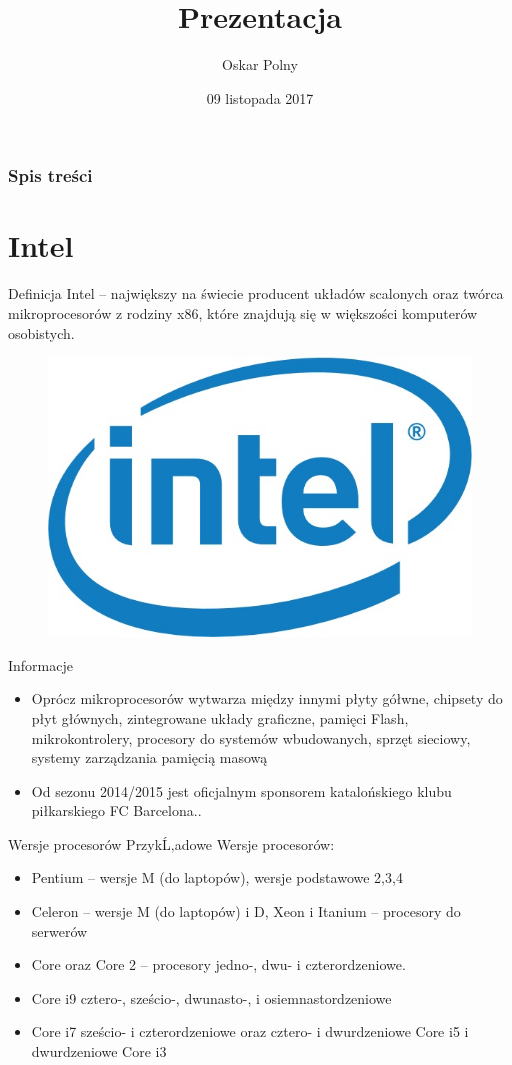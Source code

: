\documentclass{beamer}
\title{Prezentacja}
\author{Oskar Polny}
\date{09 listopada 2017}
\begin{document}
\frame{\titlepage}
\begin{frame}
\frametitle{Spis treści}
\tableofcontents
\end{frame}
\section{Intel}
\begin{frame}{Definicja}
Intel – największy na świecie producent układów scalonych oraz twórca mikroprocesorów z rodziny x86, które znajdują się w większości komputerów osobistych.
\begin{figure}
\centering
\includegraphics[scale=0.20]{Intel.jpg}
\end{figure}
\end{frame}
\begin{frame}{Informacje}
\begin{itemize}
\item<1-2> Oprócz mikroprocesorów wytwarza między innymi płyty gółwne, chipsety do płyt głównych, zintegrowane układy graficzne, pamięci Flash, mikrokontrolery, procesory do systemów wbudowanych, sprzęt sieciowy, systemy zarządzania pamięcią masową
\pause
\item<-2> Od sezonu 2014/2015 jest oficjalnym sponsorem katalońskiego klubu piłkarskiego FC Barcelona..
\end{itemize}
\end{frame}
\begin{frame}{Wersje procesorów}
PrzykĹ‚adowe Wersje procesorów:
\begin{itemize}
\item<1-5> Pentium – wersje M (do laptopów), wersje podstawowe 2,3,4
\item<2-5> Celeron – wersje M (do laptopów) i D, Xeon i Itanium – procesory do serwerów
\item<3-5> Core oraz Core 2 – procesory jedno-, dwu- i czterordzeniowe.
\item<4-5>  Core i9 cztero-, sześcio-, dwunasto-, i osiemnastordzeniowe
\item<5>  Core i7 sześcio- i czterordzeniowe oraz cztero- i dwurdzeniowe Core i5 i dwurdzeniowe Core i3
\end{itemize}
\end{frame}
\end{document}

